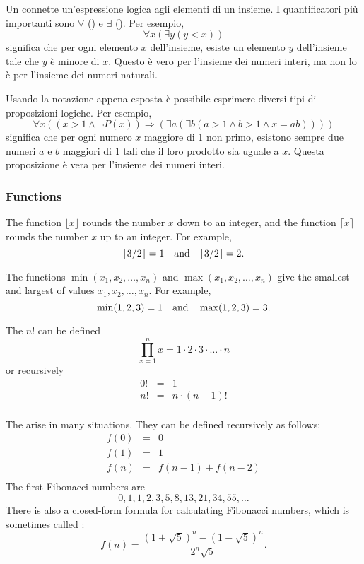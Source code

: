 
Un  connette un'espressione logica 
agli elementi di un insieme. 
I quantificatori più importanti sono
$\forall$ () e $\exists$ ().
Per esempio,
\[\forall x (\exists y (y < x))\]
significa che per ogni elemento $x$ dell'insieme,
esiste un elemento $y$ dell'insieme tale che
$y$ è minore di $x$.
Questo è vero per l'insieme dei numeri interi, 
ma non lo è per l'insieme dei numeri naturali. 

Usando la notazione appena esposta è possibile
esprimere diversi tipi di proposizioni logiche.
Per esempio,
\[\forall x ((x>1 \land \lnot P(x)) \Rightarrow (\exists a (\exists b (a > 1 \land b > 1 \land x = ab))))\]
significa che per ogni numero $x$ maggiore di 1 non primo,
esistono sempre due numeri $a$ e $b$ maggiori di 1 tali che
il loro prodotto sia uguale a $x$.
Questa proposizione è vera per l'insieme dei numeri interi.

\subsubsection{Functions}

The function $\lfloor x \rfloor$ rounds the number $x$
down to an integer, and the function
$\lceil x \rceil$ rounds the number $x$
up to an integer. For example,
\[ \lfloor 3/2 \rfloor = 1 \hspace{10px} \textrm{and} \hspace{10px} \lceil 3/2 \rceil = 2.\]

The functions $\min(x_1,x_2,\ldots,x_n)$
and $\max(x_1,x_2,\ldots,x_n)$
give the smallest and largest of values
$x_1,x_2,\ldots,x_n$.
For example,
\[ \min(1,2,3)=1 \hspace{10px} \textrm{and} \hspace{10px} \max(1,2,3)=3.\]


The  $n!$ can be defined
\[\prod_{x=1}^n x = 1 \cdot 2 \cdot 3 \cdot \ldots \cdot n\]
or recursively
\[
\begin{array}{lcl}
0! & = & 1 \\
n! & = & n \cdot (n-1)! \\
\end{array}
\]


The 
arise in many situations.
They can be defined recursively as follows:
\[
\begin{array}{lcl}
f(0) & = & 0 \\
f(1) & = & 1 \\
f(n) & = & f(n-1)+f(n-2) \\
\end{array}
\]
The first Fibonacci numbers are
\[0, 1, 1, 2, 3, 5, 8, 13, 21, 34, 55, \ldots\]
There is also a closed-form formula
for calculating Fibonacci numbers, which is sometimes called
 :
\[f(n)=\frac{(1 + \sqrt{5})^n - (1-\sqrt{5})^n}{2^n \sqrt{5}}.\]

